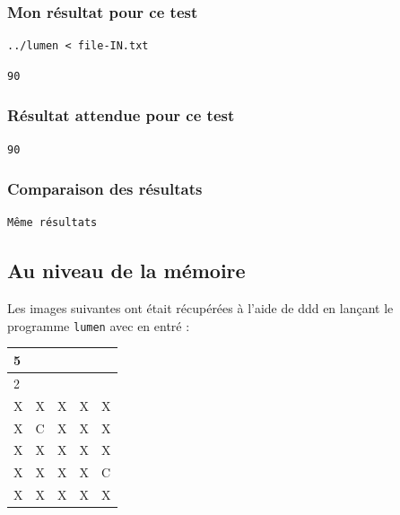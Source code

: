 \documentclass[11pt]{article}
\begin{document}
\subsubsection{Mon résultat pour ce test}
\label{sec:org3a5c9a1}

\begin{verbatim}
../lumen < file-IN.txt
\end{verbatim}

\label{org62f69d1}
\begin{verbatim}
90
\end{verbatim}

\subsubsection{Résultat attendue pour ce test}
\label{sec:orgf33a561}

\label{org84f8efc}
\begin{verbatim}
90
\end{verbatim}

\subsubsection{Comparaison des résultats}
\label{sec:org97b0f2f}

\begin{verbatim}
Même résultats
\end{verbatim}

\subsection{Au niveau de la mémoire}
\label{sec:orgadda56a}

Les images suivantes ont était récupérées à l'aide de ddd en lançant le programme \texttt{lumen} avec en entré :

\begin{center}
\begin{tabular}{lllll}
\hline
5 &  &  &  & \\
\hline
2 &  &  &  & \\
\hline
X & X & X & X & X\\
X & C & X & X & X\\
X & X & X & X & X\\
X & X & X & X & C\\
X & X & X & X & X\\
\hline
\end{tabular}
\end{center}
\end{document}
